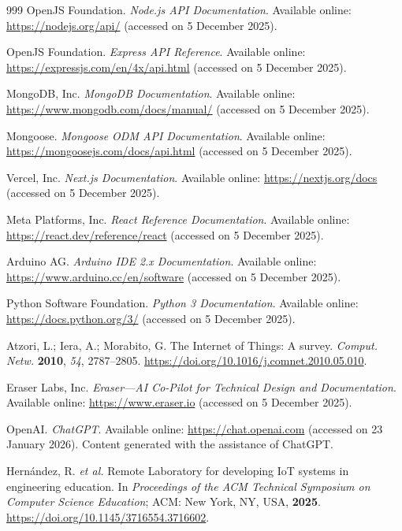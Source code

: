 \documentclass[journal,article,submit,pdftex]{Definitions/mdpi}
\begin{document}
\begin{thebibliography}{999}
OpenJS Foundation.
\textit{Node.js API Documentation}.
Available online: \url{https://nodejs.org/api/} (accessed on 5 December 2025).

OpenJS Foundation.
\textit{Express API Reference}.
Available online: \url{https://expressjs.com/en/4x/api.html} (accessed on 5 December 2025).

MongoDB, Inc.
\textit{MongoDB Documentation}.
Available online: \url{https://www.mongodb.com/docs/manual/} (accessed on 5 December 2025).

Mongoose.
\textit{Mongoose ODM API Documentation}.
Available online: \url{https://mongoosejs.com/docs/api.html} (accessed on 5 December 2025).

Vercel, Inc.
\textit{Next.js Documentation}.
Available online: \url{https://nextjs.org/docs} (accessed on 5 December 2025).

Meta Platforms, Inc.
\textit{React Reference Documentation}.
Available online: \url{https://react.dev/reference/react} (accessed on 5 December 2025).

Arduino AG.
\textit{Arduino IDE 2.x Documentation}.
Available online: \url{https://www.arduino.cc/en/software} (accessed on 5 December 2025).

Python Software Foundation.
\textit{Python 3 Documentation}.
Available online: \url{https://docs.python.org/3/} (accessed on 5 December 2025).

Atzori, L.; Iera, A.; Morabito, G.
The Internet of Things: A survey.
\textit{Comput. Netw.} \textbf{2010}, \textit{54}, 2787--2805.
\href{https://doi.org/10.1016/j.comnet.2010.05.010}{https://doi.org/10.1016/j.comnet.2010.05.010}.

Eraser Labs, Inc.
\textit{Eraser---AI Co-Pilot for Technical Design and Documentation}.
Available online: \url{https://www.eraser.io} (accessed on 5 December 2025).

OpenAI. \textit{ChatGPT}.
Available online: \url{https://chat.openai.com} (accessed on 23 January 2026). Content generated with the assistance of ChatGPT.

Hern\'andez, R. \textit{et al.}
Remote Laboratory for developing IoT systems in engineering education.
In \textit{Proceedings of the ACM Technical Symposium on Computer Science Education}; ACM: New York, NY, USA, \textbf{2025}.
\href{https://doi.org/10.1145/3716554.3716602}{https://doi.org/10.1145/3716554.3716602}.


\end{thebibliography}
\end{document}
